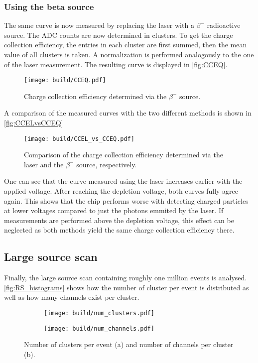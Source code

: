 \subsubsection{Using the beta source}

The same curve is now measured by replacing the laser with a $\beta^-$ radioactive source.
The ADC counts are now determined in clusters. To get the charge collection efficiency,
the entries in each cluster are first summed, then the mean value of all clusters is taken.
A normalization is performed analogously to the one of the laser measurement.
The resulting curve is displayed in \autoref{fig:CCEQ}.

\begin{figure}[H]
  \centering
  \texttt{[image: build/CCEQ.pdf]}
  \caption{Charge collection efficiency determined via the $\beta^-$ source.}
  \label{fig:CCEQ}
\end{figure}

A comparison of the measured curves with the two different methods is shown in \autoref{fig:CCELvsCCEQ}

\begin{figure}[H]
  \centering
  \texttt{[image: build/CCEL\_vs\_CCEQ.pdf]}
  \caption{Comparison of the charge collection efficiency determined via the laser and the $\beta^-$ source, respectively.}
  \label{fig:CCELvsCCEQ}
\end{figure}

One can see that the curve measured using the laser increases earlier with the applied voltage. After reaching the depletion voltage,
both curves fully agree again. This shows that the chip performs worse with detecting charged particles at lower voltages compared to
just the photons emmited by the laser. If measurements are performed above the depletion voltage, this effect can be neglected as both
methods yield the same charge collection efficiency there.

\subsection{Large source scan}

Finally, the large source scan containing roughly one million events is analysed.
\autoref{fig:RS_histograms} shows how the number of cluster per event is distributed
as well as how many channels exist per cluster.

\begin{figure}[H]
  \centering
    \begin{subfigure}{0.45\textwidth}
      \texttt{[image: build/num\_clusters.pdf]}
      \caption{}
    \end{subfigure}
    \begin{subfigure}{0.45\textwidth}
      \texttt{[image: build/num\_channels.pdf]}
      \caption{}
    \end{subfigure}
  \caption{Number of clusters per event (a) and number of channels per cluster (b).}
  \label{fig:RS_histograms}
\end{figure}


